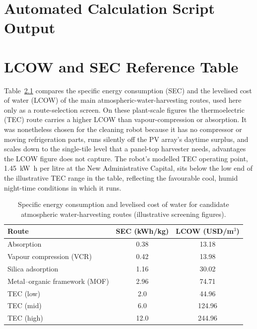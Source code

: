 \documentclass[12pt,a4paper]{report}   %
\begin{document}
\appendix
\chapter{Automated Calculation Script Output}


\chapter{LCOW and SEC Reference Table}

Table~\ref{tab:lcow} compares the specific energy consumption (SEC) and the levelised cost of
water (LCOW) of the main atmospheric-water-harvesting routes, used here only as a route-selection
screen. On these plant-scale figures the thermoelectric (TEC) route carries a higher LCOW than
vapour-compression or absorption. It was nonetheless chosen for the cleaning robot because it has
no compressor or moving refrigeration parts, runs silently off the PV array's daytime surplus, and
scales down to the single-tile level that a panel-top harvester needs, advantages the LCOW
figure does not capture. The robot's modelled TEC operating point, \SI{1.45}{\kilo\watt\hour} per
litre at the New Administrative Capital, sits below the low end of the illustrative TEC range in
the table, reflecting the favourable cool, humid night-time conditions in which it runs.

\begin{table}[htbp]
\centering
\caption{Specific energy consumption and levelised cost of water for candidate atmospheric
water-harvesting routes (illustrative screening figures).}
\label{tab:lcow}
\begin{tabular}{lcc}
\toprule
\textbf{Route} & \textbf{SEC (kWh/kg)} & \textbf{LCOW (USD/m$^3$)} \\
\midrule
Absorption        & 0.38 & 13.18 \\
Vapour compression (VCR) & 0.42 & 13.98 \\
Silica adsorption & 1.16 & 30.02 \\
Metal--organic framework (MOF) & 2.96 & 74.71 \\
TEC (low)         & 2.0  & 44.96 \\
TEC (mid)         & 6.0  & 124.96 \\
TEC (high)        & 12.0 & 244.96 \\
\bottomrule
\end{tabular}
\end{table}
\end{document}
